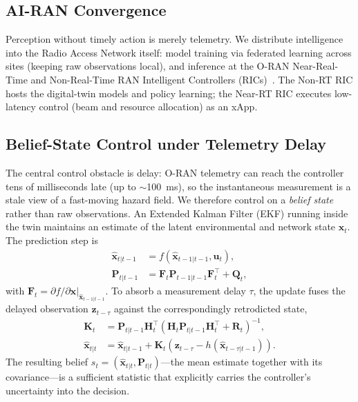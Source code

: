 \documentclass[10pt,twocolumn]{article}
\begin{document}
\subsection{AI-RAN Convergence}
Perception without timely action is merely telemetry. We distribute intelligence
into the Radio Access Network itself: model training via federated learning
across sites (keeping raw observations local), and inference at the O-RAN
Near-Real-Time and Non-Real-Time RAN Intelligent Controllers
(RICs)~\cite{oran_isac}. The Non-RT RIC hosts the digital-twin models and policy
learning; the Near-RT RIC executes low-latency control (beam and resource
allocation) as an xApp.

\subsection{Belief-State Control under Telemetry Delay}
The central control obstacle is delay: O-RAN telemetry can reach the controller
tens of milliseconds late (up to $\sim$100~ms), so the instantaneous
measurement is a stale view of a fast-moving hazard field. We therefore control
on a \emph{belief state} rather than raw observations. An Extended Kalman Filter
(EKF) running inside the twin maintains an estimate of the latent environmental
and network state $\mathbf{x}_t$. The prediction step is
\begin{align}
\hat{\mathbf{x}}_{t|t-1} &= f(\hat{\mathbf{x}}_{t-1|t-1},\mathbf{u}_t),\\
\mathbf{P}_{t|t-1} &= \mathbf{F}_t \mathbf{P}_{t-1|t-1}\mathbf{F}_t^{\top} +
\mathbf{Q}_t,
\end{align}
with $\mathbf{F}_t = \left.\partial f/\partial\mathbf{x}
\right|_{\hat{\mathbf{x}}_{t-1|t-1}}$. To absorb a measurement delay $\tau$, the
update fuses the delayed observation $\mathbf{z}_{t-\tau}$ against the
correspondingly retrodicted state,
\begin{align}
\mathbf{K}_t &= \mathbf{P}_{t|t-1}\mathbf{H}_t^{\top}
\!\left(\mathbf{H}_t \mathbf{P}_{t|t-1}\mathbf{H}_t^{\top}
+ \mathbf{R}_t\right)^{-1},\\
\hat{\mathbf{x}}_{t|t} &= \hat{\mathbf{x}}_{t|t-1}
+ \mathbf{K}_t\!\left(\mathbf{z}_{t-\tau}
- h(\hat{\mathbf{x}}_{t-\tau|t-1})\right).
\end{align}
The resulting belief $s_t = (\hat{\mathbf{x}}_{t|t}, \mathbf{P}_{t|t})$---the
mean estimate together with its covariance---is a sufficient statistic that
explicitly carries the controller's uncertainty into the decision.
\end{document}
